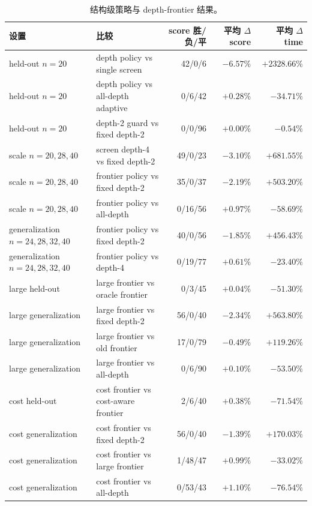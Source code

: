 \documentclass[UTF8,fontset=macnew,11pt]{ctexart}
\begin{document}
\begin{table}[H]
\centering
\scriptsize
\caption{结构级策略与 depth-frontier 结果。}
\label{tab:policy}
\begin{tabular}{llrrr}
\toprule
设置 & 比较 & score 胜/负/平 & 平均 $\Delta$ score & 平均 $\Delta$ time \\
\midrule
held-out $n=20$ & depth policy vs single screen & 42/0/6 & $-6.57\%$ & $+2328.66\%$ \\
held-out $n=20$ & depth policy vs all-depth adaptive & 0/6/42 & $+0.28\%$ & $-34.71\%$ \\
held-out $n=20$ & depth-2 guard vs fixed depth-2 & 0/0/96 & $+0.00\%$ & $-0.54\%$ \\
scale $n=20,28,40$ & screen depth-4 vs fixed depth-2 & 49/0/23 & $-3.10\%$ & $+681.55\%$ \\
scale $n=20,28,40$ & frontier policy vs fixed depth-2 & 35/0/37 & $-2.19\%$ & $+503.20\%$ \\
scale $n=20,28,40$ & frontier policy vs all-depth & 0/16/56 & $+0.97\%$ & $-58.69\%$ \\
generalization $n=24,28,32,40$ & frontier policy vs fixed depth-2 & 40/0/56 & $-1.85\%$ & $+456.43\%$ \\
generalization $n=24,28,32,40$ & frontier policy vs depth-4 & 0/19/77 & $+0.61\%$ & $-23.40\%$ \\
large held-out & large frontier vs oracle frontier & 0/3/45 & $+0.04\%$ & $-51.30\%$ \\
large generalization & large frontier vs fixed depth-2 & 56/0/40 & $-2.34\%$ & $+563.80\%$ \\
large generalization & large frontier vs old frontier & 17/0/79 & $-0.49\%$ & $+119.26\%$ \\
large generalization & large frontier vs all-depth & 0/6/90 & $+0.10\%$ & $-53.50\%$ \\
cost held-out & cost frontier vs cost-aware frontier & 2/6/40 & $+0.38\%$ & $-71.54\%$ \\
cost generalization & cost frontier vs fixed depth-2 & 56/0/40 & $-1.39\%$ & $+170.03\%$ \\
cost generalization & cost frontier vs large frontier & 1/48/47 & $+0.99\%$ & $-33.02\%$ \\
cost generalization & cost frontier vs all-depth & 0/53/43 & $+1.10\%$ & $-76.54\%$ \\
\bottomrule
\end{tabular}
\end{table}
\end{document}
